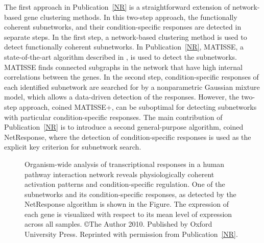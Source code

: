 The first approach in Publication~\ref{NR} is a straightforward
extension of network-based gene clustering methods. In this two-step
approach, the functionally coherent subnetworks, and their
condition-specific responses are detected in separate steps. In the
first step, a network-based clustering method is used to detect
functionally coherent subnetworks.  In Publication~\ref{NR}, MATISSE,
a state-of-the-art algorithm described in \cite{Ulitsky07}, is used to
detect the subnetworks. MATISSE finds connected subgraphs in the
network that have high internal correlations between the genes.  In
the second step, condition-specific responses of each identified
subnetwork are searched for by a nonparametric Gaussian mixture model,
which allows a data-driven detection of the responses. However, the
two-step approach, coined MATISSE+, can be suboptimal for detecting
subnetworks with particular condition-specific responses. The main
contribution of Publication~\ref{NR} is to introduce a second
general-purpose algorithm, coined NetResponse, where the detection of
condition-specific responses is used as the explicit key criterion for
subnetwork search.

\begin{figure}[t]
\begin{center}
\end{center}
\caption{Organism-wide analysis of transcriptional responses in a
  human pathway interaction network reveals physiologically coherent
  activation patterns and condition-specific regulation. One of the
  subnetworks and its condition-specific responses, as detected by the
  NetResponse algorithm is shown in the Figure. The expression of each
  gene is visualized with respect to its mean level of expression
  across all samples. \copyright The Author 2010. Published by Oxford
  University Press. Reprinted with permission from
  Publication~\ref{NR}.}
\label{fig:netresponse}
\end{figure}


